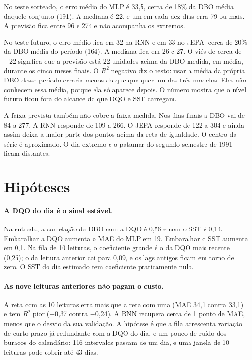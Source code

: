 \documentclass[11pt,a4paper]{article}
\begin{document}
No teste sorteado, o erro médio do MLP é 33,5, cerca de 18\% da DBO média daquele conjunto (191). A mediana é 22, e um em cada dez dias erra 79 ou mais. A previsão fica entre 96 e 274 e não acompanha os extremos.

No teste futuro, o erro médio fica em 32 na RNN e em 33 no JEPA, cerca de 20\% da DBO média do período (164). A mediana fica em 26 e 27. O viés de cerca de $-$22 significa que a previsão está 22 unidades acima da DBO medida, em média, durante os cinco meses finais. O \(R^{2}\) negativo diz o resto: usar a média da própria DBO desse período erraria menos do que qualquer um dos três modelos. Eles não conhecem essa média, porque ela só aparece depois. O número mostra que o nível futuro ficou fora do alcance do que DQO e SST carregam.

A faixa prevista também não cobre a faixa medida. Nos dias finais a DBO vai de 84 a 277. A RNN responde de 109 a 266. O JEPA responde de 122 a 304 e ainda assim deixa a maior parte dos pontos acima da reta de igualdade. O centro da série é aproximado. O dia extremo e o patamar do segundo semestre de 1991 ficam distantes.

\section{Hipóteses}

\paragraph{A DQO do dia é o sinal estável.} Na entrada, a correlação da DBO com a DQO é 0,56 e com o SST é 0,14. Embaralhar a DQO aumenta o MAE do MLP em 19. Embaralhar o SST aumenta em 0,1. Na fila de 10 leituras, o coeficiente grande é o da DQO mais recente (0,25); o da leitura anterior cai para 0,09, e os lags antigos ficam em torno de zero. O SST do dia estimado tem coeficiente praticamente nulo.

\paragraph{As nove leituras anteriores não pagam o custo.} A reta com as 10 leituras erra mais que a reta com uma (MAE 34,1 contra 33,1) e tem \(R^{2}\) pior ($-$0,37 contra $-$0,24). A RNN recupera cerca de 1 ponto de MAE, menos que o desvio da sua validação. A hipótese é que a fila acrescenta variação de curto prazo já redundante com a DQO do dia, e um pouco de ruído dos buracos do calendário: 116 intervalos passam de um dia, e uma janela de 10 leituras pode cobrir até 43 dias.
\end{document}

